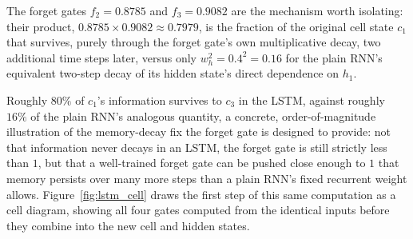 \documentclass[../ai_in_finance]{subfiles}
\begin{document}
The forget gates $f_2=0.8785$ and $f_3=0.9082$ are the mechanism worth isolating: their product, $0.8785\times0.9082\approx0.7979$, is the fraction of the original cell state $c_1$ that survives, purely through the forget gate's own multiplicative decay, two additional time steps later, versus only $w_h^2=0.4^2=0.16$ for the plain RNN's equivalent two-step decay of its hidden state's direct dependence on $h_1$.

Roughly $80\%$ of $c_1$'s information survives to $c_3$ in the LSTM, against roughly $16\%$ of the plain RNN's analogous quantity, a concrete, order-of-magnitude illustration of the memory-decay fix the forget gate is designed to provide: not that information never decays in an LSTM, the forget gate is still strictly less than $1$, but that a well-trained forget gate can be pushed close enough to $1$ that memory persists over many more steps than a plain RNN's fixed recurrent weight allows. Figure~\ref{fig:lstm_cell} draws the first step of this same computation as a cell diagram, showing all four gates computed from the identical inputs before they combine into the new cell and hidden states.
\end{document}
